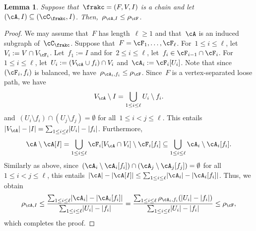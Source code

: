 \documentclass[11pt]{amsart}
\DeclarePairedDelimiter{\abs}{\lvert}{\rvert}
\newtheorem{lemma}[algocf]{Lemma}
\theoremstyle{definition}
\numberwithin{equation}{section}
\begin{document}
	\begin{lemma}\label{lemma: ladder subextension density}
		Suppose that~$\frakc=(F,V,I)$ is a chain and let~$(\cA,I)\subseteq(\cC_\frakc,I)$.
		Then,~$\rho_{\cA,I}\leq\rho_\cF$.
	\end{lemma}
	\begin{proof}
		We may assume that~$F$ has length~$\ell\geq 1$ and that~$\cA$ is an induced subgraph of~$\cC_\frakc$.
		Suppose that~$F=\cF_1,\ldots,\cF_\ell$.
		For~$1\leq i\leq\ell$, let~$V_i:=V\cap V_{\cF_i}$.
		Let~$f_1:=I$ and for~$2\leq i\leq\ell$, let~$f_i\in\cF_{i-1}\cap \cF_{i}$.
		For~$1\leq i\leq\ell$, let~$U_i:=(V_\cA\cup f_i)\cap V_i$ and~$\cA_i:=\cF_i[U_i]$.
		Note that since~$(\cF_i,f_i)$ is balanced, we have~$\rho_{\cA_i,f_i}\leq \rho_\cF$.
		Since~$F$ is a vertex-separated loose path, we have
		\begin{equation*}
			V_\cA\setminus I
			=\bigcup_{1\leq i\leq \ell} U_{i}\setminus f_i.
		\end{equation*}
		and~$(U_i\setminus f_i)\cap (U_j\setminus f_j)=\emptyset$ for all~$1\leq i<j\leq \ell$.
		This entails~$\abs{V_\cA}-\abs{I}=\sum_{1\leq i\leq \ell}\abs{U_i}-\abs{f_i}$.
		Furthermore,
		\begin{equation*}
			\cA\setminus\cA[I]
			=\bigcup_{1\leq i\leq \ell} \cF_i[V_\cA\cap V_i]\setminus\cF_i[f_i]
			\subseteq \bigcup_{1\leq i\leq \ell} \cA_i\setminus\cA_i[f_i].
		\end{equation*}
		Similarly as above, since~$(\cA_i\setminus \cA_i[f_i])\cap (\cA_j\setminus\cA_j[f_j])=\emptyset$ for all~$1\leq i<j\leq\ell$, this entails~$\abs{\cA}-\abs{\cA[I]}\leq \sum_{1\leq i\leq \ell} \abs{\cA_i}-\abs{\cA_i[f_i]}$.
		Thus, we obtain
		\begin{equation*}
			\rho_{\cA,I}
			\leq\frac{\sum_{1\leq i\leq \ell} \abs{\cA_i}-\abs{\cA_i[f_i]}}{\sum_{1\leq i\leq \ell}\abs{U_i}-\abs{f_i}}
			=\frac{\sum_{1\leq i\leq \ell} \rho_{\cA_i,f_i}(\abs{U_i}-\abs{f_i})}{\sum_{1\leq i\leq \ell}\abs{U_i}-\abs{f_i}}
			\leq \rho_\cF,
		\end{equation*}
		which completes the proof.
	\end{proof}
	
\end{document}

